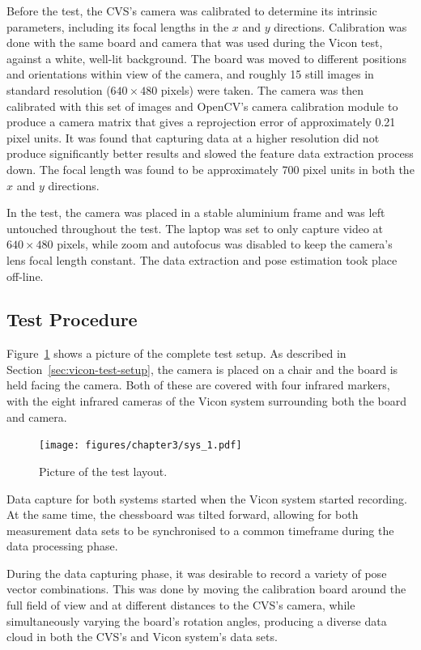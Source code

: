 Before the test, the CVS's camera was calibrated to determine its intrinsic parameters, including its focal lengths in the $x$ and $y$ directions. Calibration was done with the same board and camera that was used during the Vicon test, against a white, well-lit background. The board was moved to different positions and orientations within view of the camera, and roughly 15 still images in standard resolution ($640\times480$ pixels) were taken. The camera was then calibrated with this set of images and OpenCV's camera calibration module to produce a camera matrix that gives a reprojection error of approximately 0.21 pixel units. It was found that capturing data at a higher resolution did not produce significantly better results and slowed the feature data extraction process down. The focal length was found to be approximately 700 pixel units in both the $x$ and $y$ directions.

In the test, the camera was placed in a stable aluminium frame and was left untouched throughout the test. The laptop was set to only capture video at $640\times480$ pixels, while zoom and autofocus was disabled to keep the camera's lens focal length constant. The data extraction and pose estimation took place off-line. 

\subsection{Test Procedure}

Figure~\ref{fig:chap3-pic-sys-layout} shows a picture of the complete test setup. As described in Section~\ref{sec:vicon-test-setup}, the camera is placed on a chair and the board is held facing the camera. Both of these are covered with four infrared markers, with the eight infrared cameras of the Vicon system surrounding both the board and camera.  

\begin{figure}
  \centering
  \texttt{[image: figures/chapter3/sys\_1.pdf]}
  \caption{Picture of the test layout.}
\label{fig:chap3-pic-sys-layout}
\end{figure}

Data capture for both systems started when the Vicon system started recording. At the same time, the chessboard was tilted forward, allowing for both measurement data sets to be synchronised to a common timeframe during the data processing phase. 

During the data capturing phase, it was desirable to record a variety of pose vector combinations. This was done  by moving the calibration board around the full field of view and at different distances to the CVS's camera, while simultaneously varying the board's rotation angles, producing a diverse data cloud in both the CVS's and Vicon system's data sets. 

